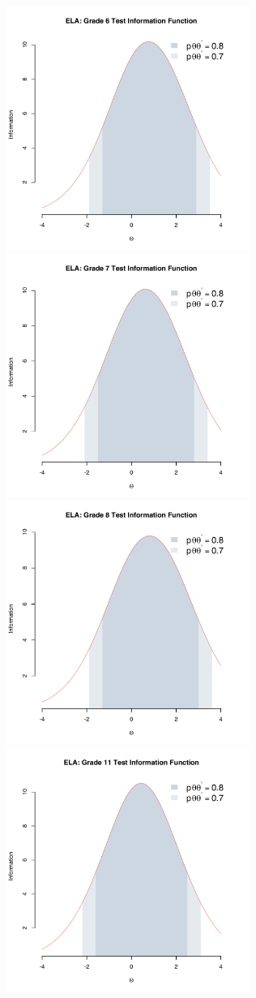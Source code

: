 \documentclass[]{article}
\begin{document}
\includegraphics[height=3.12500in]{tifs/ela6tif.pdf}
\includegraphics[height=3.12500in]{tifs/ela7tif.pdf}
\includegraphics[height=3.12500in]{tifs/ela8tif.pdf}
\includegraphics[height=3.12500in]{tifs/ela11tif.pdf} \newpage
\end{document}
